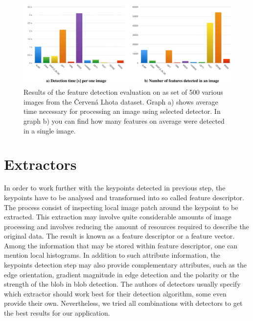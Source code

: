 \begin{figure}[ht]
	\begin{center}
		\includegraphics[keepaspectratio,width=\textwidth]{fig/detectors.pdf}
	\end{center}
	\caption{Results of the feature detection evaluation on as set of 500 various images from the Červená Lhota dataset. Graph a) shows average time necessary for processing an image using selected detector. In graph b) you can find how many features on average were detected in a single image.}
	\label{fig:detectors}
\end{figure}

\section{Extractors}
\label{sec:extractors}
In order to work further with the keypoints detected in previous step, the keypoints have to be analysed and transformed into so called feature descriptor. The process consist of inspecting local image patch around the keypoint to be extracted. This extraction may involve quite considerable amounts of image processing and involves reducing the amount of resources required to describe the original data. The result is known as a feature descriptor or a feature vector. Among the information that may be stored within feature descriptor, one can mention local histograms. In addition to such attribute information, the keypoints detection step may also provide complementary attributes, such as the edge orientation, gradient magnitude in edge detection and the polarity or the strength of the blob in blob detection. The authors of detectors usually specify which extractor should work best for their detection algorithm, some even provide their own. Nevertheless, we tried all combinations with detectors to get the best results for our application.

